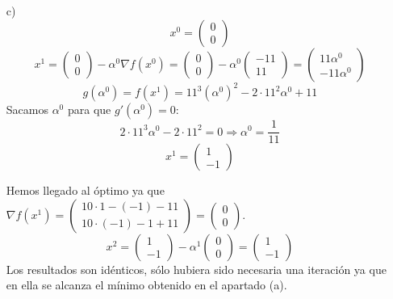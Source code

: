 \documentclass[PM.tex]{subfiles}
\begin{document}
\begin{example}
\begin{itemize}
	\item[c)] 
	\[ x^0 = \begin{pmatrix}0\\0\end{pmatrix} \]
	\[ x^1 = \begin{pmatrix}0\\0\end{pmatrix} - α^0 \nabla f(x^0) = \begin{pmatrix}0\\0\end{pmatrix} - α^0 \begin{pmatrix}-11\\11\end{pmatrix} = \begin{pmatrix}11α^0\\-11α^0\end{pmatrix} \]
	\[ g(α^0) = f(x^1) = 11^3(α^0)^2-2\cdot 11^2α^0 + 11 \]
	Sacamos $α^0$ para que $g'(α^0)=0$:
	\[ 2\cdot 11^3 α^0 - 2 \cdot 11^2 = 0 \Rightarrow α^0 = \frac{1}{11} \]
	\[ x^1 = \begin{pmatrix}1\\-1\end{pmatrix} \]
	
	Hemos llegado al óptimo ya que $\nabla f(x^1) = \begin{pmatrix}
		10 \cdot 1 - (-1) - 11\\
		10 \cdot (-1) - 1 + 11
\end{pmatrix} = \begin{pmatrix}0\\0\end{pmatrix}$.
\[ x^2 = \begin{pmatrix}1 \\ -1\end{pmatrix} - α^1 \begin{pmatrix}0\\0\end{pmatrix} = \begin{pmatrix}1\\-1\end{pmatrix} \]
Los resultados son idénticos, sólo hubiera sido necesaria una iteración ya que en ella se alcanza el mínimo obtenido en el apartado (a).
\end{itemize}
\end{example}
\end{document}
